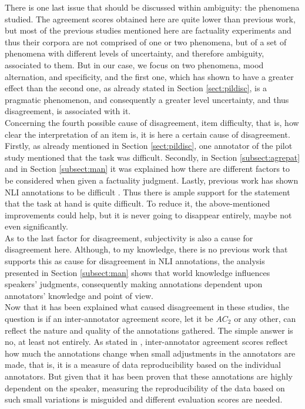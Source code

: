 There is one last issue that should be discussed within ambiguity: the phenomena studied. The agreement scores obtained here are quite lower than previous work, but most of the previous studies mentioned here are factuality experiments and thus their corpora are not comprised of one or two phenomena, but of a set of phenomena with different levels of uncertainty, and therefore ambiguity, associated to them. But in our case, we focus on two phenomena, mood alternation, and specificity, and the first one, which has shown to have a greater effect than the second one, as already stated in Section \ref{sect:pildisc}, is a pragmatic phenomenon, and consequently a greater level uncertainty, and thus disagreement, is associated with it.\\

Concerning the fourth possible cause of disagreement, item difficulty, that is, how clear the interpretation of an item is, it is here a certain cause of disagreement. Firstly, as already mentioned in Section \ref{sect:pildisc}, one annotator of the pilot study mentioned that the task was difficult. Secondly, in Section \ref{subsect:agrepat} and in Section \ref{subsect:man} it was explained how there are different factors to be considered when given a factuality judgment. Lastly, previous work has shown NLI annotations to be difficult \citep{pavlick2019inherent,uma2021learning}. Thus there is ample support for the statement that the task at hand is quite difficult. To reduce it, the above-mentioned improvements could help, but it is never going to disappear entirely, maybe not even significantly.\\

As to the last factor for disagreement, subjectivity is also a cause for disagreement here. Although, to my knowledge, there is no previous work that supports this as cause for disagreement in NLI annotations, the analysis presented in Section \ref{subsect:man} shows that world knowledge influences speakers' judgments, consequently making annotations dependent upon annotators' knowledge and point of view.\\

Now that it has been explained what caused disagreement in these studies, the question is if an inter-annotator agreement score, let it be $AC_2$ or any other, can reflect the nature and quality of the annotations gathered. The simple answer is no, at least not entirely. As stated in \citet{gwet2014handbook}, inter-annotator agreement scores reflect how much the annotations change when small adjustments in the annotators are made, that is, it is a measure of data reproducibility based on the individual annotators. But given that it has been proven that these annotations are highly dependent on the speaker, measuring the reproducibility of the data based on such small variations is misguided and different evaluation scores are needed.\\

